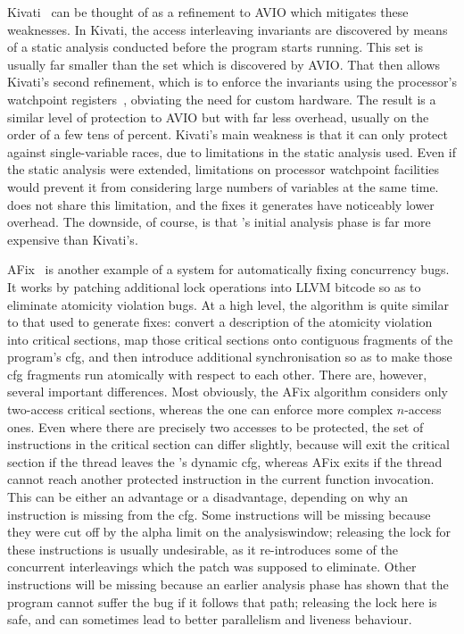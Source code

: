 Kivati~\cite{Chew2010} can be thought of as a refinement to AVIO which
mitigates these weaknesses.  In Kivati, the access interleaving
invariants are discovered by means of a static analysis conducted
before the program starts running.  This set is usually far smaller
than the set which is discovered by AVIO.  That then allows Kivati's
second refinement, which is to enforce the invariants using the
processor's watchpoint registers~\cite[Chapter 16.2: Debug
  Registers]{Intel2009}, obviating the need for custom hardware.  The
result is a similar level of protection to AVIO but with far less
overhead, usually on the order of a few tens of percent.  Kivati's
main weakness is that it can only protect against single-variable
races, due to limitations in the static analysis used.  Even if the
static analysis were extended, limitations on processor watchpoint
facilities would prevent it from considering large numbers of
variables at the same time.  {\Technique} does not share this
limitation, and the fixes it generates have noticeably lower overhead.
The downside, of course, is that {\technique}'s initial analysis phase
is far more expensive than Kivati's.

AFix~\cite{Jin2011} is another example of a system for automatically
fixing concurrency bugs.  It works by patching additional lock
operations into LLVM bitcode so as to eliminate atomicity violation
bugs.  At a high level, the algorithm is quite similar to that used to
generate {\technique} fixes: convert a description of the atomicity
violation into critical sections, map those critical sections onto
contiguous fragments of the program's \gls{cfg}, and then introduce
additional synchronisation so as to make those \gls{cfg} fragments run
atomically with respect to each other.  There are, however, several
important differences.  Most obviously, the AFix algorithm considers
only two-access critical sections, whereas the {\technique} one can
enforce more complex $n$-access ones.  Even where there are precisely
two accesses to be protected, the set of instructions in the critical
section can differ slightly, because {\technique} will exit the
critical section if the thread leaves the {\StateMachine}'s dynamic
\gls{cfg}, whereas AFix exits if the thread cannot reach another
protected instruction in the current function invocation.  This can be
either an advantage or a disadvantage, depending on why an instruction
is missing from the {\StateMachine} \gls{cfg}.  Some instructions will
be missing because they were cut off by the \gls{alpha} limit on the
\gls{analysiswindow}; releasing the lock for these instructions is
usually undesirable, as it re-introduces some of the concurrent
interleavings which the patch was supposed to eliminate.  Other
instructions will be missing because an earlier analysis phase has
shown that the program cannot suffer the bug if it follows that path;
releasing the lock here is safe, and can sometimes lead to better
parallelism and liveness behaviour.

